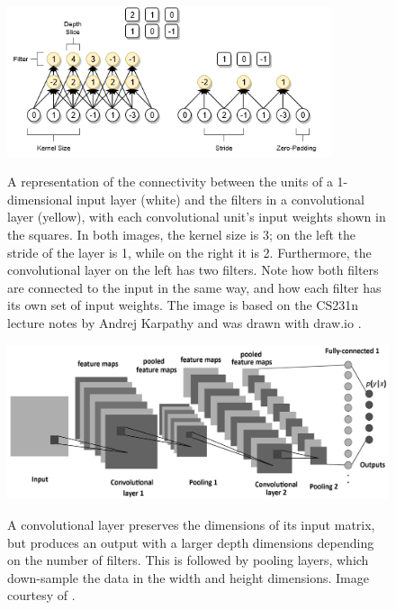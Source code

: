 \documentclass[12pt, titlepage]{report}
\theoremstyle{definition}
\begin{document}
\begin{figure}
    \centering
    \includegraphics[width=0.85\textwidth]{img/convolution.png}\\
    \caption{A representation of the connectivity between the units of a 1-dimensional input layer (white) and the filters in a convolutional layer (yellow), with each convolutional unit's input weights shown in the squares. In both images, the kernel size is 3; on the left the stride of the layer is 1, while on the right it is 2. Furthermore, the convolutional layer on the left has two filters. Note how both filters are connected to the input in the same way, and how each filter has its own set of input weights. The image is based on the CS231n lecture notes by Andrej Karpathy \cite[Convolutional Neural Networks: Architectures, Convolution / Pooling Layers]{karpathy2017cs231n} and was drawn with draw.io \cite{jgraph2018draw}.}
    \label{figure:convolution1d}
\end{figure}

\begin{figure}
\centering
\includegraphics[width=1\textwidth]{img/conv_pooling.png}\\
\caption{A convolutional layer preserves the dimensions of its input matrix, but produces an output with a larger depth dimensions depending on the number of filters. This is followed by pooling layers, which down-sample the data in the width and height dimensions. Image courtesy of \cite{albelwi2017framework}.}
\label{figure:conv_pooling}
\end{figure}
\end{document}
